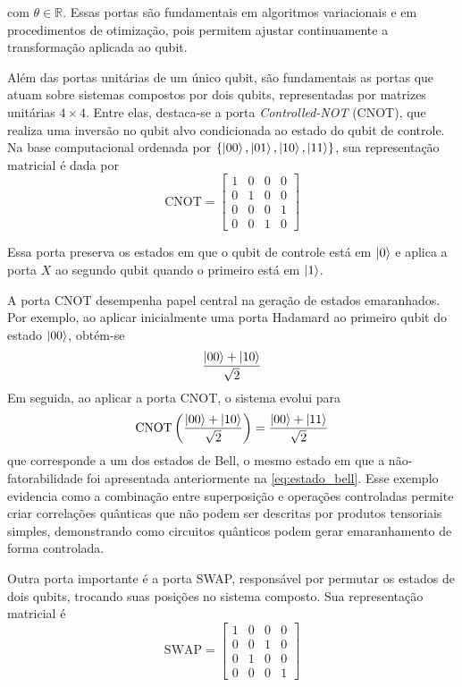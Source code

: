 \noindent com \(\theta\in\mathbb{R}\). Essas portas são fundamentais em algoritmos variacionais e em procedimentos de otimização, pois permitem ajustar continuamente a transformação aplicada ao qubit.

Além das portas unitárias de um único qubit, são fundamentais as portas que atuam sobre sistemas compostos por dois qubits, representadas por matrizes unitárias $4\times4$. Entre elas, destaca-se a porta \textit{Controlled-NOT} (CNOT), que realiza uma inversão no qubit alvo condicionada ao estado do qubit de controle. Na base computacional ordenada por $\{\ket{00},\ket{01},\ket{10},\ket{11}\}$, sua representação matricial é dada por
$$
    \mathrm{CNOT}= \left[
    \begin{array}{cccc}
        1 & 0 & 0 & 0\\
        0 & 1 & 0 & 0\\
        0 & 0 & 0 & 1\\
        0 & 0 & 1 & 0
    \end{array} \right]
$$

Essa porta preserva os estados em que o qubit de controle está em $\ket{0}$ e aplica a porta $X$ ao segundo qubit quando o primeiro está em $\ket{1}$. 

A porta CNOT desempenha papel central na geração de estados emaranhados. Por exemplo, ao aplicar inicialmente uma porta Hadamard ao primeiro qubit do estado $\ket{00}$, obtém-se
$$
\frac{\ket{00}+\ket{10}}{\sqrt{2}}
$$
Em seguida, ao aplicar a porta CNOT, o sistema evolui para
$$
\mathrm{CNOT}\left(\frac{\ket{00}+\ket{10}}{\sqrt{2}}\right)
=
\frac{\ket{00}+\ket{11}}{\sqrt{2}}
$$
que corresponde a um dos estados de Bell, o mesmo estado em que a  não-fatorabilidade foi apresentada anteriormente na \autoref{eq:estado_bell}. Esse exemplo evidencia como a combinação entre superposição e operações controladas permite criar correlações quânticas que não podem ser descritas por produtos tensoriais simples, demonstrando como circuitos quânticos podem gerar emaranhamento de forma controlada.


Outra porta importante é a porta SWAP, responsável por permutar os estados de dois qubits, trocando suas posições no sistema composto. Sua representação matricial é
$$
    \mathrm{SWAP}= \left[
    \begin{array}{cccc}
        1 & 0 & 0 & 0\\
        0 & 0 & 1 & 0\\
        0 & 1 & 0 & 0\\
        0 & 0 & 0 & 1
    \end{array} \right]
$$

